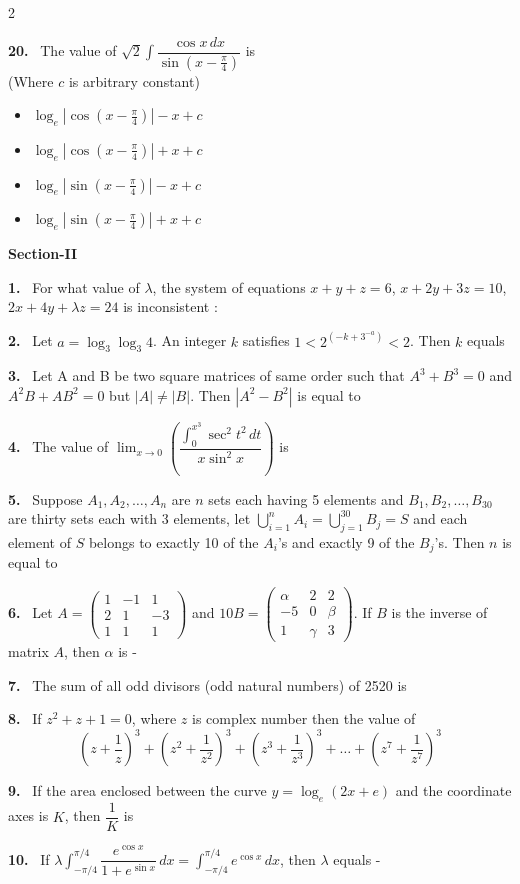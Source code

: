 \documentclass[10pt]{extarticle}
\newcommand{\sect}[1]{\par\smallskip\noindent\textbf{#1}\par}
\newcommand{\qn}[1]{\par\smallskip\noindent\textbf{#1.}~}
\newenvironment{qoptions}{\begin{itemize}[leftmargin=1.8em,itemsep=1pt,topsep=2pt,label={}]}{\end{itemize}}
\newcommand{\opt}[2]{\item[(#1)] #2}
\begin{document}
\begin{multicols}{2}
\qn{20} The value of $\sqrt2\displaystyle\int\dfrac{\cos x\,dx}{\sin\left(x-\frac{\pi}{4}\right)}$ is\\
(Where $c$ is arbitrary constant)
\begin{qoptions}
\opt{A}{$\log_e\left|\cos\left(x-\frac{\pi}{4}\right)\right|-x+c$}
\opt{B}{$\log_e\left|\cos\left(x-\frac{\pi}{4}\right)\right|+x+c$}
\opt{C}{$\log_e\left|\sin\left(x-\frac{\pi}{4}\right)\right|-x+c$}
\opt{D}{$\log_e\left|\sin\left(x-\frac{\pi}{4}\right)\right|+x+c$}
\end{qoptions}

\sect{Section-II}

\qn{1} For what value of $\lambda$, the system of equations $x+y+z=6$, $x+2y+3z=10$, $2x+4y+\lambda z=24$ is inconsistent :

\qn{2} Let $a=\log_3\log_3 4$. An integer $k$ satisfies $1<2^{\left(-k+3^{-a}\right)}<2$. Then $k$ equals

\qn{3} Let A and B be two square matrices of same order such that $A^3+B^3=0$ and $A^2B+AB^2=0$ but $|A|\neq|B|$. Then $|A^2-B^2|$ is equal to

\qn{4} The value of $\displaystyle\lim_{x\to0}\left(\dfrac{\displaystyle\int_0^{x^3}\sec^2t^2\,dt}{x\sin^2x}\right)$ is

\qn{5} Suppose $A_1,A_2,\dots,A_n$ are $n$ sets each having 5 elements and $B_1,B_2,\dots,B_{30}$ are thirty sets each with 3 elements, let $\displaystyle\bigcup_{i=1}^{n}A_i=\bigcup_{j=1}^{30}B_j=S$ and each element of $S$ belongs to exactly 10 of the $A_i$'s and exactly 9 of the $B_j$'s. Then $n$ is equal to

\qn{6} Let $A=\begin{pmatrix}1&-1&1\\2&1&-3\\1&1&1\end{pmatrix}$ and $10B=\begin{pmatrix}\alpha&2&2\\-5&0&\beta\\1&\gamma&3\end{pmatrix}$. If $B$ is the inverse of matrix $A$, then $\alpha$ is -

\qn{7} The sum of all odd divisors (odd natural numbers) of 2520 is

\qn{8} If $z^2+z+1=0$, where $z$ is complex number then the value of
\[\left(z+\frac1z\right)^3+\left(z^2+\frac1{z^2}\right)^3+\left(z^3+\frac1{z^3}\right)^3+\dots+\left(z^7+\frac1{z^7}\right)^3\]

\qn{9} If the area enclosed between the curve $y=\log_e(2x+e)$ and the coordinate axes is $K$, then $\dfrac1K$ is

\qn{10} If $\lambda\displaystyle\int_{-\pi/4}^{\pi/4}\dfrac{e^{\cos x}}{1+e^{\sin x}}\,dx=\int_{-\pi/4}^{\pi/4}e^{\cos x}\,dx$, then $\lambda$ equals -
\end{multicols}
\end{document}
